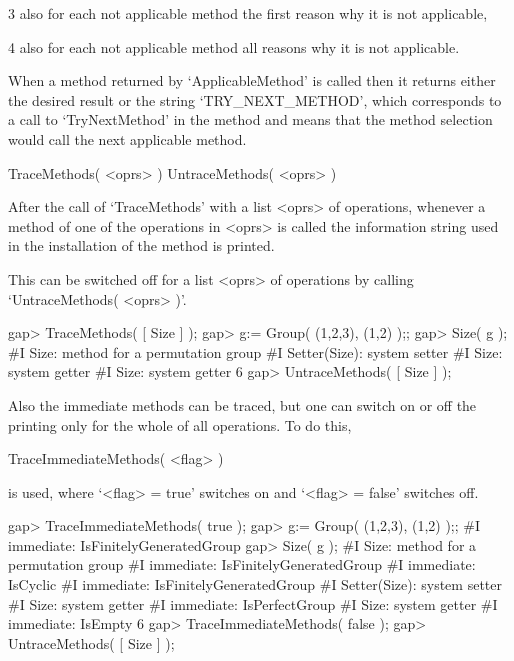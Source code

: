 \item{3}
    also for each not applicable method the first reason why it is not
    applicable,

\item{4}
    also for each not applicable method all reasons why it is not
    applicable.
\endlist

When a method returned by `ApplicableMethod' is called then
it returns either the desired result or the string `TRY_NEXT_METHOD',
which corresponds to a call to `TryNextMethod' in the method
and means that the method selection would call the next applicable
method.



\>TraceMethods( <oprs> )
\)UntraceMethods( <oprs> )

After the call of `TraceMethods' with a list <oprs> of operations,
whenever a method of one of the operations in <oprs> is called
the information string used in the installation of the method is printed.

This can be switched off for a list <oprs> of operations by calling
`UntraceMethods( <oprs> )'.

\beginexample
    gap> TraceMethods( [ Size ] );
    gap> g:= Group( (1,2,3), (1,2) );;
    gap> Size( g );
    #I  Size: method for a permutation group
    #I  Setter(Size): system setter
    #I  Size: system getter
    #I  Size: system getter
    6
    gap> UntraceMethods( [ Size ] );
\endexample

Also the immediate methods can be traced, but one can switch on or off
the printing only for the whole of all operations.
To do this,

\>TraceImmediateMethods( <flag> )

is used, where `<flag> = true' switches on and `<flag> = false'
switches off.

\beginexample
    gap> TraceImmediateMethods( true );
    gap> g:= Group( (1,2,3), (1,2) );;
    #I  immediate: IsFinitelyGeneratedGroup
    gap> Size( g );
    #I  Size: method for a permutation group
    #I  immediate: IsFinitelyGeneratedGroup
    #I  immediate: IsCyclic
    #I  immediate: IsFinitelyGeneratedGroup
    #I  Setter(Size): system setter
    #I  Size: system getter
    #I  immediate: IsPerfectGroup
    #I  Size: system getter
    #I  immediate: IsEmpty
    6
    gap> TraceImmediateMethods( false );
    gap> UntraceMethods( [ Size ] );
\endexample

